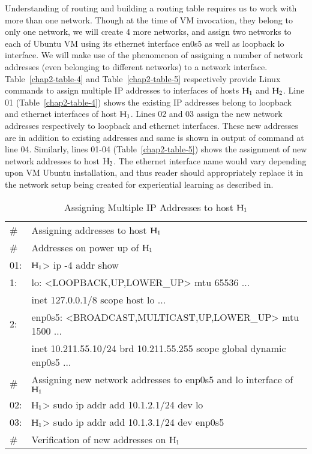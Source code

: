\begin{multicols}{2}
Understanding of routing and building a routing table requires us to work with more than one network. Though at the time of VM invocation, they belong to only one network, we will create 4 more networks, and assign two networks to each of Ubuntu VM using its ethernet interface en0s5 as well as loopback lo interface. We will make use of the phenomenon of assigning a number of network addresses (even belonging to different networks) to a network interface.  Table~\ref{chap2-table-4} and Table~\ref{chap2-table-5} respectively provide Linux commands to assign multiple IP addresses to interfaces of hosts ${\rm H}_{1}$ and ${\rm H}_{2}$. Line 01 (Table~\ref{chap2-table-4}) shows the existing IP addresses belong to loopback and ethernet interfaces of host ${\rm H}_{1}$.  Lines 02 and 03 assign the new network addresses respectively to loopback and ethernet interfaces. These new addresses are in addition to existing addresses and same is shown in output of command at line 04. Similarly, lines 01-04 (Table~\ref{chap2-table-5}) shows the assignment of new network addresses to host ${\rm H}_{2}$. The ethernet interface name would vary depending upon VM Ubuntu installation, and thus reader should appropriately replace it in the network setup being created for experiential learning as described in.
\begin{table}[H]
\caption{Assigning Multiple IP Addresses to host ${\rm H}_{1}$}
\begin{tabular}{|l@{\;}l|}
\hline
\# & Assigning addresses to host ${\rm H}_{1}$\\
\# & Addresses on power up of ${\rm H}_{1}$\\
01:& ${\rm H}_{1}$> ip -4 addr show\\
1: & lo: <LOOPBACK,UP,LOWER\_UP> mtu 65536 $\ldots$\\
   & \quad inet 127.0.0.1/8 scope host lo $\ldots$\\
2: & enp0s5: <BROADCAST,MULTICAST,UP,LOWER\_UP> mtu 1500 $\ldots$\\
   & \quad inet 10.211.55.10/24 brd 10.211.55.255 scope global dynamic enp0s5 $\ldots$\\
   \hline
\# & Assigning new network addresses to enp0s5 and lo interface of ${\rm H}_{1}$\\
02:& ${\rm H}_{1}$> sudo ip addr add 10.1.2.1/24 dev lo\\
03:& ${\rm H}_{1}$> sudo ip addr add 10.1.3.1/24 dev enp0s5\\
\hline
\# & Verification of new addresses on ${\rm H}_{1}$\\

\end{tabular}
\end{table}
\end{multicols}
